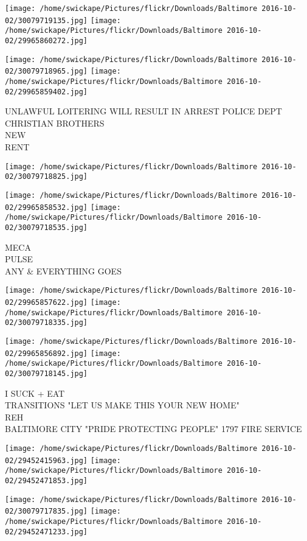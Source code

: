 \documentclass[10pt,letterpaper]{article}
\begin{document}
\texttt{[image: /home/swickape/Pictures/flickr/Downloads/Baltimore 2016-10-02/30079719135.jpg]}
\texttt{[image: /home/swickape/Pictures/flickr/Downloads/Baltimore 2016-10-02/29965860272.jpg]}

\texttt{[image: /home/swickape/Pictures/flickr/Downloads/Baltimore 2016-10-02/30079718965.jpg]}
\texttt{[image: /home/swickape/Pictures/flickr/Downloads/Baltimore 2016-10-02/29965859402.jpg]}

UNLAWFUL LOITERING WILL RESULT IN ARREST POLICE DEPT\\
CHRISTIAN BROTHERS\\
NEW\\
RENT
\pagebreak

\texttt{[image: /home/swickape/Pictures/flickr/Downloads/Baltimore 2016-10-02/30079718825.jpg]}

\vspace{0.25in}
\texttt{[image: /home/swickape/Pictures/flickr/Downloads/Baltimore 2016-10-02/29965858532.jpg]}
\texttt{[image: /home/swickape/Pictures/flickr/Downloads/Baltimore 2016-10-02/30079718535.jpg]}

MECA\\
PULSE\\
ANY \& EVERYTHING GOES
\pagebreak

\texttt{[image: /home/swickape/Pictures/flickr/Downloads/Baltimore 2016-10-02/29965857622.jpg]}
\texttt{[image: /home/swickape/Pictures/flickr/Downloads/Baltimore 2016-10-02/30079718335.jpg]}

\texttt{[image: /home/swickape/Pictures/flickr/Downloads/Baltimore 2016-10-02/29965856892.jpg]}
\texttt{[image: /home/swickape/Pictures/flickr/Downloads/Baltimore 2016-10-02/30079718145.jpg]}

I SUCK + EAT\\
TRANSITIONS "LET US MAKE THIS YOUR NEW HOME"\\
REH\\
BALTIMORE CITY "PRIDE PROTECTING PEOPLE" 1797 FIRE SERVICE
\pagebreak

\texttt{[image: /home/swickape/Pictures/flickr/Downloads/Baltimore 2016-10-02/29452415963.jpg]}
\texttt{[image: /home/swickape/Pictures/flickr/Downloads/Baltimore 2016-10-02/29452471853.jpg]}

\texttt{[image: /home/swickape/Pictures/flickr/Downloads/Baltimore 2016-10-02/30079717835.jpg]}
\texttt{[image: /home/swickape/Pictures/flickr/Downloads/Baltimore 2016-10-02/29452471233.jpg]}
\end{document}
